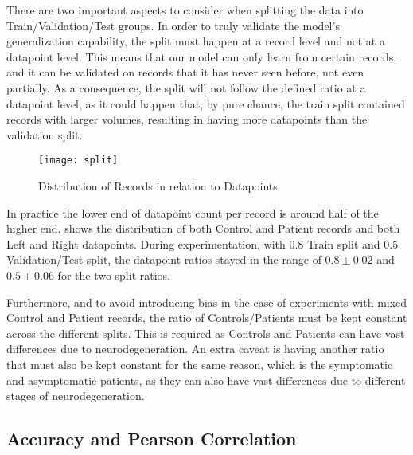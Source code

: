 There are two important aspects to consider when splitting the data into Train/Validation/Test groups. In order to truly validate the model's generalization capability, the split must happen at a record level and not at a datapoint level. This means that our model can only learn from certain records, and it can be validated on records that it has never seen before, not even partially. As a consequence, the split will not follow the defined ratio at a datapoint level, as it could happen that, by pure chance, the train split contained records with larger volumes, resulting in having more datapoints than the validation split.
\begin{figure}[H]
\centering
\texttt{[image: split]}
\caption{Distribution of Records in relation to Datapoints}
\label{fig:hist_split}
\end{figure}
In practice the lower end of datapoint count per record is around half of the higher end.  shows the distribution of both Control and Patient records and both Left and Right datapoints. During experimentation, with $0.8$ Train split and $0.5$ Validation/Test split, the datapoint ratios stayed in the range of $0.8\pm0.02$ and $0.5\pm0.06$ for the two split ratios.\par
Furthermore, and to avoid introducing bias in the case of experiments with mixed Control and Patient records, the ratio of Controls/Patients must be kept constant across the different splits. This is required as Controls and Patients can have vast differences due to neurodegeneration. An extra caveat is having another ratio that must also be kept constant for the same reason, which is the symptomatic and asymptomatic patients, as they can also have vast differences due to different stages of neurodegeneration.

\subsection{Accuracy and Pearson Correlation}
\label{sec:eval}

